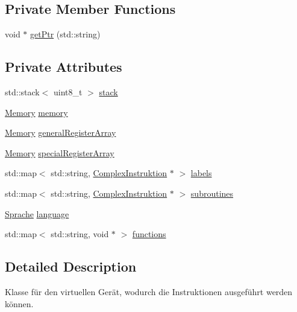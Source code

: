 \subsection*{Private Member Functions}
\begin{DoxyCompactItemize}
\item 
void $\ast$ \mbox{\hyperlink{class_virtual_machine_a7029636f9766e0394a8b9d60264a3565}{get\+Ptr}} (std\+::string)
\end{DoxyCompactItemize}
\subsection*{Private Attributes}
\begin{DoxyCompactItemize}
\item 
std\+::stack$<$ uint8\+\_\+t $>$ \mbox{\hyperlink{class_virtual_machine_a3a4c8cdda0913c9c0cdc75df23ac7cbb}{stack}}
\item 
\mbox{\hyperlink{class_memory}{Memory}} \mbox{\hyperlink{class_virtual_machine_a54136a9c003e36e77c28f31c7bef2dc2}{memory}}
\item 
\mbox{\hyperlink{class_memory}{Memory}} \mbox{\hyperlink{class_virtual_machine_aae855da52e8f3b0a167b8fec497d44d9}{general\+Register\+Array}}
\item 
\mbox{\hyperlink{class_memory}{Memory}} \mbox{\hyperlink{class_virtual_machine_a957d36537fd7570d30e342c5400ad4a6}{special\+Register\+Array}}
\item 
std\+::map$<$ std\+::string, \mbox{\hyperlink{class_complex_instruktion}{Complex\+Instruktion}} $\ast$ $>$ \mbox{\hyperlink{class_virtual_machine_a109df714b628452e9a958eddb28df6e9}{labels}}
\item 
std\+::map$<$ std\+::string, \mbox{\hyperlink{class_complex_instruktion}{Complex\+Instruktion}} $\ast$ $>$ \mbox{\hyperlink{class_virtual_machine_a91f5b9cfc45eaea5ce95b659705b2803}{subroutines}}
\item 
\mbox{\hyperlink{class_sprache}{Sprache}} \mbox{\hyperlink{class_virtual_machine_af4dd2663e7f1ea25ba6c88da94e6ef01}{language}}
\item 
std\+::map$<$ std\+::string, void $\ast$ $>$ \mbox{\hyperlink{class_virtual_machine_a1b1e03784277347206641bf47e39d6d1}{functions}}
\end{DoxyCompactItemize}


\subsection{Detailed Description}
Klasse für den virtuellen Gerät, wodurch die Instruktionen ausgeführt werden können. 

